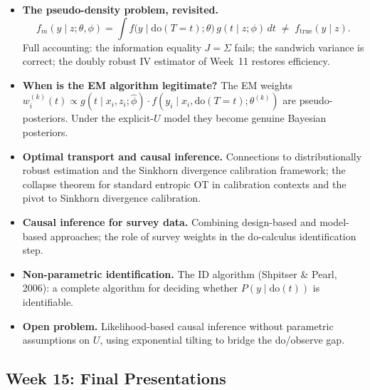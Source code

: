 \documentclass[12pt]{article}
\begin{document}
\begin{itemize}
  \item \textbf{The pseudo-density problem, revisited.}
    \[
      f_m(y \mid z;\theta,\phi)
      = \int f\!\bigl(y \mid \mathrm{do}(T{=}t);\theta\bigr)\,
             g(t \mid z;\phi)\,dt
      \;\neq\; f_{\mathrm{true}}(y \mid z).
    \]
    Full accounting: the information equality $J = \Sigma$ fails; the
    sandwich variance is correct; the doubly robust IV estimator of
    Week~11 restores efficiency.

  \item \textbf{When is the EM algorithm legitimate?}
    The EM weights $w_i^{(k)}(t) \propto g(t \mid x_i, z_i;\hat\phi)
    \cdot f(y_i \mid x_i, \mathrm{do}(T{=}t);\theta^{(k)})$ are
    pseudo-posteriors.  Under the explicit-$U$ model they become
    genuine Bayesian posteriors.

  \item \textbf{Optimal transport and causal inference.}
    Connections to distributionally robust estimation and the Sinkhorn
    divergence calibration framework; the collapse theorem for standard
    entropic OT in calibration contexts and the pivot to Sinkhorn
    divergence calibration.

  \item \textbf{Causal inference for survey data.}
    Combining design-based and model-based approaches; the role of
    survey weights in the do-calculus identification step.

  \item \textbf{Non-parametric identification.}
    The ID algorithm (Shpitser \& Pearl, 2006): a complete algorithm
    for deciding whether $P(y \mid \mathrm{do}(t))$ is identifiable.

  \item \textbf{Open problem.}
    Likelihood-based causal inference without parametric assumptions
    on $U$, using exponential tilting to bridge the do/observe gap.
\end{itemize}

\subsection*{Week 15: Final Presentations}
\end{document}

